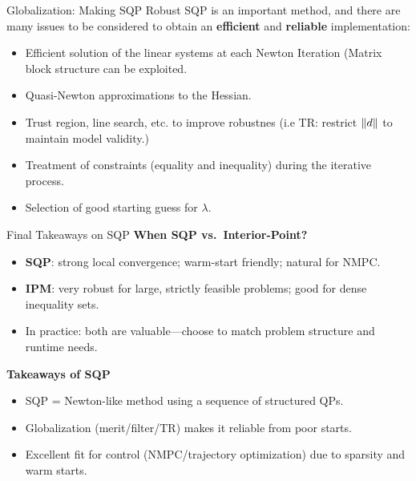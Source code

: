 \begin{frame}{Globalization: Making SQP Robust}
SQP is an important method, and there are many issues to be considered to obtain an \textbf{efficient} and \textbf{reliable} implementation:
\begin{itemize}
  \item Efficient solution of the linear systems at each Newton Iteration (Matrix block structure can be exploited.
  \item Quasi-Newton approximations to the Hessian.
  \item Trust region, line search, etc. to improve robustnes (i.e TR: restrict \(\left\lVert d \right\rVert\) to maintain model validity.)
  \item Treatment of constraints (equality and inequality) during the iterative process.
  \item Selection of good starting guess for $\lambda$.
\end{itemize}
\end{frame}

 
   
 
 

\begin{frame}{Final Takeaways on SQP}
\textbf{When SQP vs.\ Interior-Point?}
\begin{itemize}
  \item \textbf{SQP}: strong local convergence; warm-start friendly; natural for NMPC.
  \item \textbf{IPM}: very robust for large, strictly feasible problems; good for dense inequality sets.
  \item In practice: both are valuable—choose to match problem structure and runtime needs.
\end{itemize} 
\textbf{Takeaways of SQP} 
\begin{itemize}
  \item SQP = Newton-like method using a sequence of structured QPs.
  \item Globalization (merit/filter/TR) makes it reliable from poor starts.
  \item Excellent fit for control (NMPC/trajectory optimization) due to sparsity and warm starts.
\end{itemize}
\end{frame}
